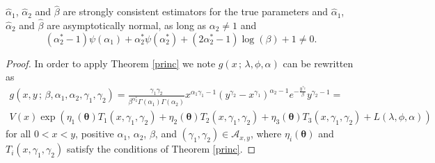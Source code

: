 \documentclass[lineno]{biometrika}
\newcommand{\bs}{\boldsymbol}
\newcommand{\on}{\operatorname}
\begin{document}
\begin{proposition}\label{proofgamma} $\hat\alpha_{1}$, $\hat\alpha_{2}$ and $\hat\beta$ are strongly consistent estimators for the true parameters and $\hat{\alpha}_1$, $\hat{\alpha}_2$ and $\hat{\beta}$ are asymptotically normal, as long as $\alpha_2\neq 1$ and
\begin{equation*}
(\alpha_2^*-1)\psi(\alpha_1) + \alpha_2^*\psi(\alpha_2^*) + (2\alpha_2^*-1)\log(\beta) + 1\neq 0.
\end{equation*}
\end{proposition}
\begin{proof}


In order to apply Theorem \ref{princ}
 we note $g(x\,;\,\lambda,\phi,\alpha)$ can be rewritten as
 \begin{equation*}
 \begin{aligned}
g(x,y\,;\,\beta,\alpha_1,\alpha_2,\gamma_1,\gamma_2) = \frac{\gamma_1\gamma_2}{\beta^{\alpha^*_2} \Gamma(\alpha_1)\Gamma(\alpha_2)} x^{\alpha_1\gamma_1-1} \left(y^{\gamma_2} - x^{\gamma_1}\right)^{\alpha_2-1} e^{-\frac{y^{\gamma_2}}{\beta}} y^{\gamma_2 - 1}
=\\ V(x)\exp\left(\eta_1(\bs{\theta})T_1(x,\gamma_1,\gamma_2)+\eta_2(\bs{\theta})T_2(x,\gamma_1,\gamma_2)+\eta_3(\bs{\theta})T_3(x,\gamma_1,\gamma_2)+L(\lambda,\phi,\alpha)\right)
 \end{aligned}
 \end{equation*}
for all $0<x<y$, positive $\alpha_1$, $\alpha_2$, $\beta$, and $(\gamma_1,\gamma_2)\in \mathcal{A}_{x,y}$, where $\eta_i(\bs{\theta})$ and $T_i(x,\gamma_1,\gamma_2)$ satisfy the conditions of Theorem \ref{princ}.


\end{proof}
\end{document}
